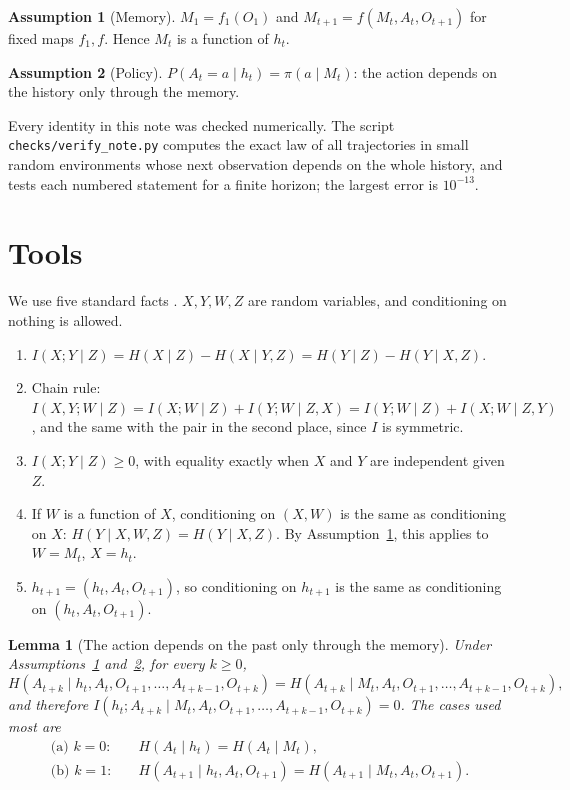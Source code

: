 \documentclass{article}
\newtheorem{lemma}[proposition]{Lemma}
\theoremstyle{definition}
\newtheorem{assumption}{Assumption}
\theoremstyle{remark}
\begin{document}
\begin{assumption}[Memory]\label{as:mem}
$M_1=f_1(O_1)$ and $M_{t+1}=f(M_t,A_t,O_{t+1})$ for fixed maps $f_1,f$. Hence $M_t$ is a function of $h_t$.
\end{assumption}

\begin{assumption}[Policy]\label{as:pol}
$P(A_t=a\mid h_t)=\pi(a\mid M_t)$: the action depends on the history only through the memory.
\end{assumption}

Every identity in this note was checked numerically. The script \texttt{checks/verify\_note.py} computes the exact law of all trajectories in small random environments whose next observation depends on the whole history, and tests each numbered statement for a finite horizon; the largest error is $10^{-13}$.

\section{Tools}\label{sec:tools}

We use five standard facts \citep[Ch.~2]{cover2006elements}. $X,Y,W,Z$ are random variables, and conditioning on nothing is allowed.
\begin{enumerate}
\item[(T1)] $I(X;Y\mid Z)=H(X\mid Z)-H(X\mid Y,Z)=H(Y\mid Z)-H(Y\mid X,Z)$.
\item[(T2)] Chain rule: $I(X,Y;W\mid Z)=I(X;W\mid Z)+I(Y;W\mid Z,X)=I(Y;W\mid Z)+I(X;W\mid Z,Y)$, and the same with the pair in the second place, since $I$ is symmetric.
\item[(T3)] $I(X;Y\mid Z)\ge0$, with equality exactly when $X$ and $Y$ are independent given $Z$.
\item[(T4)] If $W$ is a function of $X$, conditioning on $(X,W)$ is the same as conditioning on $X$: $H(Y\mid X,W,Z)=H(Y\mid X,Z)$. By Assumption~\ref{as:mem}, this applies to $W=M_t$, $X=h_t$.
\item[(T5)] $h_{t+1}=(h_t,A_t,O_{t+1})$, so conditioning on $h_{t+1}$ is the same as conditioning on $(h_t,A_t,O_{t+1})$.
\end{enumerate}

\begin{lemma}[The action depends on the past only through the memory]\label{lem:action}
Under Assumptions~\ref{as:mem} and~\ref{as:pol}, for every $k\ge0$,
\[
H(A_{t+k}\mid h_t,A_t,O_{t+1},\dots,A_{t+k-1},O_{t+k})=H(A_{t+k}\mid M_t,A_t,O_{t+1},\dots,A_{t+k-1},O_{t+k}),
\]
and therefore $I(h_t;A_{t+k}\mid M_t,A_t,O_{t+1},\dots,A_{t+k-1},O_{t+k})=0$. The cases used most are
\begin{align*}
\text{(a) } k=0:&\quad H(A_t\mid h_t)=H(A_t\mid M_t),\\
\text{(b) } k=1:&\quad H(A_{t+1}\mid h_t,A_t,O_{t+1})=H(A_{t+1}\mid M_t,A_t,O_{t+1}).
\end{align*}
\end{lemma}
\end{document}
